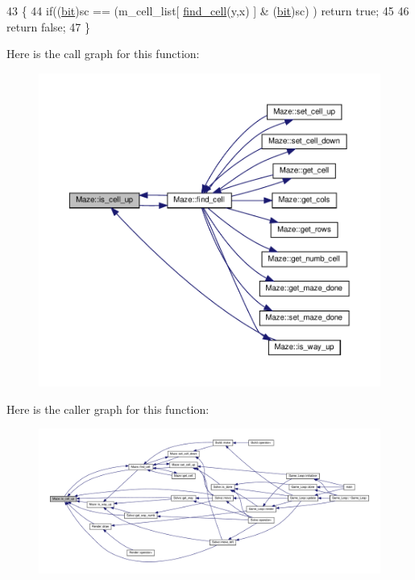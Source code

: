 \begin{DoxyCode}
43 \{
44     \textcolor{keywordflow}{if}((\hyperlink{maze_8h_a789d352559efaa396a258805d44f4289}{bit})sc == (m\_cell\_list[ \hyperlink{classMaze_aa59b935dcd5f7129636cea6e40882c56}{find\_cell}(y,x) ] & (\hyperlink{maze_8h_a789d352559efaa396a258805d44f4289}{bit})sc) ) \textcolor{keywordflow}{return} \textcolor{keyword}{true};
45 
46     \textcolor{keywordflow}{return} \textcolor{keyword}{false};
47 \}
\end{DoxyCode}
Here is the call graph for this function\+:\nopagebreak
\begin{figure}[H]
\begin{center}
\leavevmode
\includegraphics[width=350pt]{classMaze_a2b0e69e72d6c3e1037578f057946a21e_cgraph}
\end{center}
\end{figure}
Here is the caller graph for this function\+:\nopagebreak
\begin{figure}[H]
\begin{center}
\leavevmode
\includegraphics[width=350pt]{classMaze_a2b0e69e72d6c3e1037578f057946a21e_icgraph}
\end{center}
\end{figure}
\mbox{\label{classMaze_ad5dd6a918e4fd4bb6392e0a0bc08b81d}} 
